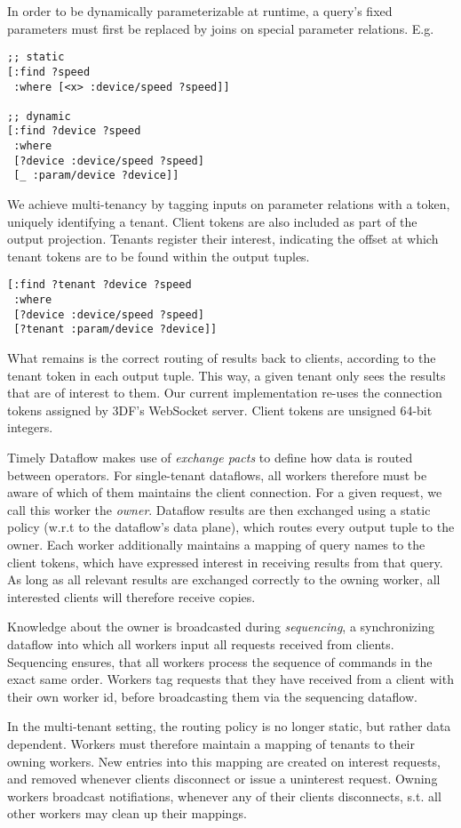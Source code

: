 \documentclass[../index.tex]{subfiles}
\begin{document}
In order to be dynamically parameterizable at runtime, a query's fixed
parameters must first be replaced by joins on special parameter
relations. E.g.

\begin{lstlisting}[language=datalog, style=colorlog]
;; static
[:find ?speed
 :where [<x> :device/speed ?speed]]  

;; dynamic
[:find ?device ?speed
 :where
 [?device :device/speed ?speed]
 [_ :param/device ?device]]
\end{lstlisting}

We achieve multi-tenancy by tagging inputs on parameter relations with
a token, uniquely identifying a tenant. Client tokens are also
included as part of the output projection. Tenants register their
interest, indicating the offset at which tenant tokens are to be found
within the output tuples.

\begin{lstlisting}[language=datalog, style=colorlog]
[:find ?tenant ?device ?speed
 :where
 [?device :device/speed ?speed]
 [?tenant :param/device ?device]]
\end{lstlisting}

What remains is the correct routing of results back to clients,
according to the tenant token in each output tuple. This way, a given
tenant only sees the results that are of interest to them. Our current
implementation re-uses the connection tokens assigned by 3DF's
WebSocket server. Client tokens are unsigned 64-bit integers.

Timely Dataflow makes use of \emph{exchange pacts} to define how data
is routed between operators. For single-tenant dataflows, all workers
therefore must be aware of which of them maintains the client
connection. For a given request, we call this worker the
\emph{owner}. Dataflow results are then exchanged using a static
policy (w.r.t to the dataflow's data plane), which routes every output
tuple to the owner. Each worker additionally maintains a mapping of
query names to the client tokens, which have expressed interest in
receiving results from that query. As long as all relevant results are
exchanged correctly to the owning worker, all interested clients will
therefore receive copies.

Knowledge about the owner is broadcasted during \emph{sequencing}, a
synchronizing dataflow into which all workers input all requests
received from clients. Sequencing ensures, that all workers process
the sequence of commands in the exact same order. Workers tag requests
that they have received from a client with their own worker id, before
broadcasting them via the sequencing dataflow.

In the multi-tenant setting, the routing policy is no longer static,
but rather data dependent. Workers must therefore maintain a mapping
of tenants to their owning workers. New entries into this mapping are
created on interest requests, and removed whenever clients disconnect
or issue a uninterest request. Owning workers broadcast notifiations,
whenever any of their clients disconnects, s.t. all other workers may
clean up their mappings.
\end{document}
